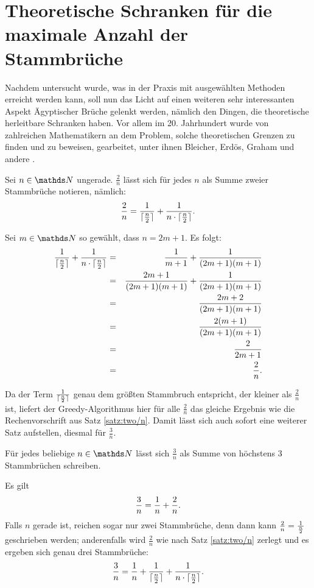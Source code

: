 \section[Theoretische Schranken]{Theoretische Schranken für die maximale Anzahl der Stammbrüche}\label{sec:theorie}
Nachdem untersucht wurde, was in der Praxis mit ausgewählten Methoden erreicht werden kann, soll nun das Licht auf einen weiteren sehr interessanten Aspekt Ägyptischer Brüche gelenkt werden, nämlich den Dingen, die theoretische herleitbare Schranken haben. Vor allem im 20. Jahrhundert wurde von zahlreichen Mathematikern an dem Problem, solche theoretischen Grenzen zu finden und zu beweisen, gearbeitet, unter ihnen Bleicher, Erdös, Graham und andere \cite[S.87 ff]{Guy1981}.

\begin{satz}\label{satz:two/n}
	Sei $n \in \N$ ungerade. $\frac{2}{n}$ lässt sich für jedes $n$ als Summe zweier Stammbrüche notieren, nämlich:
	$$\frac{2}{n} = \frac{1}{\lceil \frac{n}{2} \rceil} + \frac{1}{n \cdot \lceil \frac{n}{2} \rceil}.$$
\end{satz}
\begin{bew}
	Sei $m \in \N$ so gewählt, dass $n=2m+1$. Es folgt:
	\begin{eqnarray*}
		\frac{1}{\lceil \frac{n}{2} \rceil} + \frac{1}{n \cdot \lceil \frac{n}{2} \rceil} & = & \frac{1}{m+1} + \frac{1}{(2m+1)(m+1)}\\
		& = & \frac{2m+1}{(2m+1)(m+1)} + \frac{1}{(2m+1)(m+1)}\\
		& = & \frac{2m+2}{(2m+1)(m+1)}\\
		& = & \frac{2(m+1)}{(2m+1)(m+1)}\\
		& = & \frac{2}{2m+1}\\
		& = & \frac{2}{n}.
	\end{eqnarray*}
\end{bew}

Da der Term $\frac{1}{\lceil \frac{n}{2} \rceil}$ genau dem größten Stammbruch entspricht, der kleiner als $\frac{2}{n}$ ist, liefert der Greedy-Algorithmus hier für alle $\frac{2}{n}$ das gleiche Ergebnis wie die Rechenvorschrift aus Satz \ref{satz:two/n}. Damit lässt sich auch sofort eine weiterer Satz aufstellen, diesmal für $\frac{3}{n}$.

\begin{satz}
	Für jedes beliebige $n \in \N$ lässt sich $\frac{3}{n}$ als Summe von höchstens 3 Stammbrüchen schreiben.
\end{satz}
\begin{bew}
	Es gilt
	$$\frac{3}{n} = \frac{1}{n} + \frac{2}{n}.$$
	Falls $n$ gerade ist, reichen sogar nur zwei Stammbrüche, denn dann kann $\frac{2}{n} = \frac{1}{\frac{n}{2}}$ geschrieben werden; anderenfalls wird $\frac{2}{n}$ wie nach Satz \ref{satz:two/n} zerlegt und es ergeben sich genau drei Stammbrüche:
	$$\frac{3}{n} = \frac{1}{n} + \frac{1}{\lceil \frac{n}{2} \rceil} + \frac{1}{n \cdot \lceil \frac{n}{2} \rceil}.$$
\end{bew}

